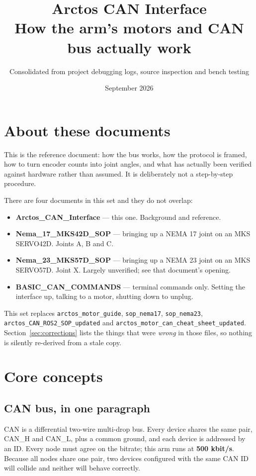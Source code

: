 \documentclass[11pt,letterpaper]{article}
\title{Arctos CAN Interface \\ \large How the arm's motors and CAN bus actually work}
\author{Consolidated from project debugging logs, source inspection and bench testing}
\date{September 2026}
\begin{document}
\maketitle
\tableofcontents
\newpage

\section{About these documents}

This is the reference document: how the bus works, how the protocol is framed, how
to turn encoder counts into joint angles, and what has actually been verified
against hardware rather than assumed. It is deliberately not a step-by-step
procedure.

There are four documents in this set and they do not overlap:

\begin{itemize}[leftmargin=*]
    \item \textbf{Arctos\_CAN\_Interface} --- this one. Background and reference.
    \item \textbf{Nema\_17\_MKS42D\_SOP} --- bringing up a NEMA 17 joint on an MKS
          SERVO42D. Joints A, B and C.
    \item \textbf{Nema\_23\_MKS57D\_SOP} --- bringing up a NEMA 23 joint on an MKS
          SERVO57D. Joint X. Largely unverified; see that document's opening.
    \item \textbf{BASIC\_CAN\_COMMANDS} --- terminal commands only. Setting the
          interface up, talking to a motor, shutting down to unplug.
\end{itemize}

This set replaces \texttt{arctos\_motor\_guide}, \texttt{sop\_nema17},
\texttt{sop\_nema23}, \texttt{arctos\_CAN\_ROS2\_SOP\_updated} and
\texttt{arctos\_motor\_can\_cheat\_sheet\_updated}. Section~\ref{sec:corrections}
lists the things that were \emph{wrong} in those files, so nothing is silently
re-derived from a stale copy.

\section{Core concepts}

\subsection{CAN bus, in one paragraph}
CAN is a differential two-wire multi-drop bus. Every device shares the same pair,
CAN\_H and CAN\_L, plus a common ground, and each device is addressed by an ID.
Every node must agree on the bitrate; this arm runs at \textbf{500 kbit/s}. Because
all nodes share one pair, two devices configured with the same CAN ID will collide
and neither will behave correctly.
\end{document}
